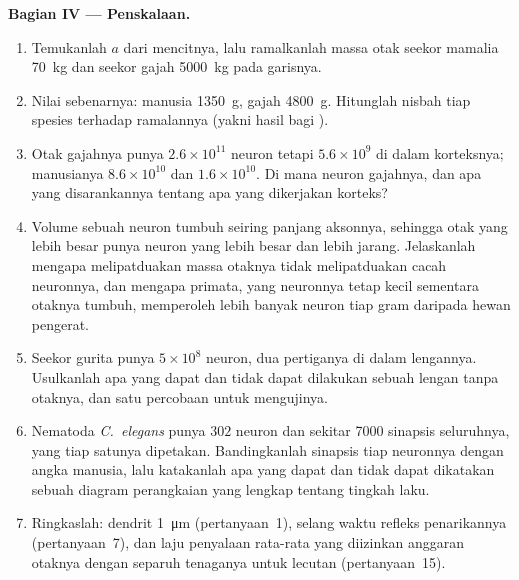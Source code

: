 \begin{problem}
\medskip
\noindent\textbf{Bagian IV --- Penskalaan.}
\begin{enumerate}[resume]
  \item Temukanlah $a$ dari mencitnya, lalu ramalkanlah massa otak seekor
        mamalia \qty{70}{kg} dan seekor gajah \qty{5000}{kg} pada
        garisnya.
  \item Nilai sebenarnya: manusia \qty{1350}{g}, gajah \qty{4800}{g}.
        Hitunglah nisbah tiap spesies terhadap ramalannya (yakni
        hasil bagi ).
  \item Otak gajahnya punya $2.6\times 10^{11}$ neuron tetapi
        $5.6\times 10^{9}$ di dalam korteksnya; manusianya $8.6\times 10^{10}$
        dan $1.6\times 10^{10}$. Di mana neuron gajahnya, dan
        apa yang disarankannya tentang apa yang dikerjakan korteks?
  \item Volume sebuah neuron tumbuh seiring panjang aksonnya, sehingga otak yang
        lebih besar punya neuron yang lebih besar dan lebih jarang. Jelaskanlah mengapa
        melipatduakan massa otaknya tidak melipatduakan cacah neuronnya, dan mengapa
        primata, yang neuronnya tetap kecil sementara otaknya tumbuh, memperoleh
        lebih banyak neuron tiap gram daripada hewan pengerat.
  \item Seekor gurita punya $5\times 10^{8}$ neuron, dua pertiganya di dalam lengannya.
        Usulkanlah apa yang dapat dan tidak dapat dilakukan sebuah lengan tanpa otaknya, dan
        satu percobaan untuk mengujinya.
  \item Nematoda \emph{C.~elegans} punya $302$ neuron dan sekitar
        \num{7000} sinapsis seluruhnya, yang tiap satunya dipetakan. Bandingkanlah
        sinapsis tiap neuronnya dengan angka manusia, lalu katakanlah apa yang dapat dan
        tidak dapat dikatakan sebuah diagram perangkaian yang lengkap tentang tingkah laku.
  \item Ringkaslah:  dendrit \qty{1}{\micro m}
        (pertanyaan~1), selang waktu refleks penarikannya (pertanyaan~7), dan
        laju penyalaan rata-rata yang diizinkan anggaran otaknya dengan separuh
        tenaganya untuk lecutan (pertanyaan~15).
\end{enumerate}
\end{problem}
